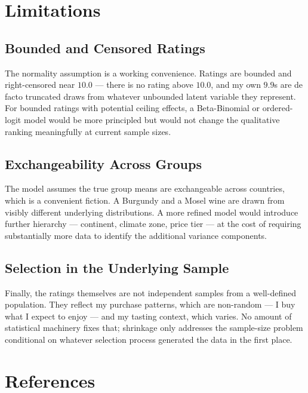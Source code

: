 \documentclass[11pt]{article}
\begin{document}
\section{Limitations}

\subsection{Bounded and Censored Ratings}

The normality assumption is a working convenience. Ratings are bounded
and right-censored near $10.0$ --- there is no rating above $10.0$, and
my own $9.9$s are de facto truncated draws from whatever unbounded
latent variable they represent. For bounded ratings with potential
ceiling effects, a Beta-Binomial or ordered-logit model would be more
principled but would not change the qualitative ranking meaningfully at
current sample sizes.

\subsection{Exchangeability Across Groups}

The model assumes the true group means are exchangeable across
countries, which is a convenient fiction. A Burgundy and a Mosel wine
are drawn from visibly different underlying distributions. A more
refined model would introduce further hierarchy --- continent, climate
zone, price tier --- at the cost of requiring substantially more data
to identify the additional variance components.

\subsection{Selection in the Underlying Sample}

Finally, the ratings themselves are not independent samples from a
well-defined population. They reflect my purchase patterns, which are
non-random --- I buy what I expect to enjoy --- and my tasting context,
which varies. No amount of statistical machinery fixes that; shrinkage
only addresses the sample-size problem conditional on whatever
selection process generated the data in the first place.

\section{References}
\end{document}
